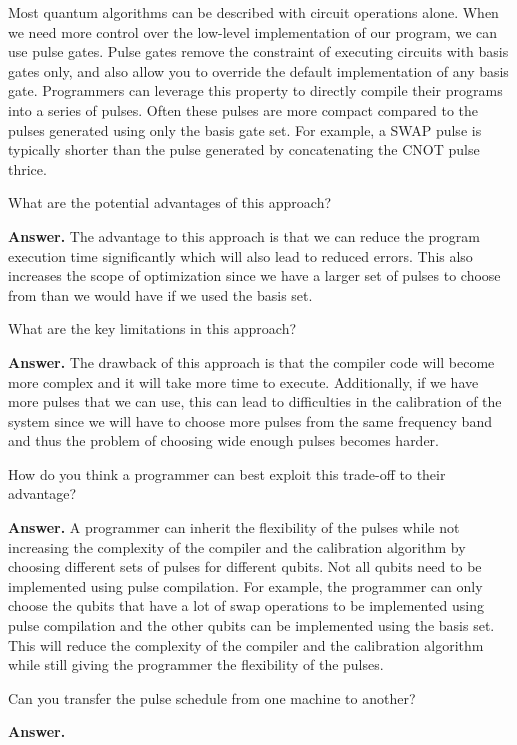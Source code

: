 Most quantum algorithms can be described with circuit operations alone. When we need more control over the low-level implementation of our program, we can use pulse gates. Pulse gates remove the constraint of executing circuits with basis gates only, and also allow you to override the default implementation of any basis gate. Programmers can leverage this property to directly compile their programs into a series of pulses. Often these pulses are more compact compared to the pulses generated using only the basis gate set. For example, a SWAP pulse is typically shorter than the pulse generated by concatenating the CNOT pulse thrice.

\tcbline{}

\begin{question}
    What are the potential advantages of this approach?
\end{question}
\textbf{Answer.} The advantage to this approach is that we can reduce the program execution time significantly which will also lead to reduced errors. This also increases the scope of optimization since we have a larger set of pulses to choose from than we would have if we used the basis set.

\tcbline{}

\begin{question}
    What are the key limitations in this approach?
\end{question}
\textbf{Answer.} The drawback of this approach is that the compiler code will become more complex and it will take more time to execute. Additionally, if we have more pulses that we can use, this can lead to difficulties in the calibration of the system since we will have to choose more pulses from the same frequency band and thus the problem of choosing wide enough pulses becomes harder.

\tcbline{}

\begin{question}
    How do you think a programmer can best exploit this trade-off to their advantage?
\end{question}
\textbf{Answer.} A programmer can inherit the flexibility of the pulses while not increasing the complexity of the compiler and the calibration algorithm by choosing different sets of pulses for different qubits. Not all qubits need to be implemented using pulse compilation. For example, the programmer can only choose the qubits that have a lot of swap operations to be implemented using pulse compilation and the other qubits can be implemented using the basis set. This will reduce the complexity of the compiler and the calibration algorithm while still giving the programmer the flexibility of the pulses.

\tcbline{}

\begin{question}
    Can you transfer the pulse schedule from one machine to another?
\end{question}
\textbf{Answer.} %